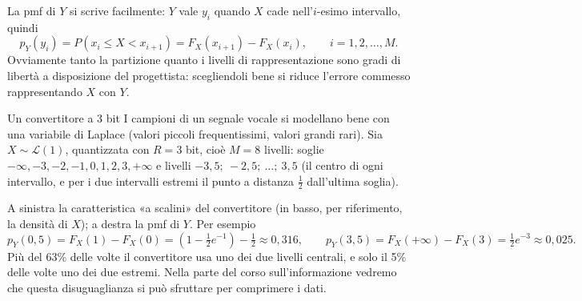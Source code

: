 La pmf di $Y$ si scrive facilmente: $Y$ vale $y_i$ quando $X$ cade nell'$i$-esimo intervallo, quindi
\[ p_Y(y_i) = P(x_i \leq X < x_{i+1}) = F_X(x_{i+1}) - F_X(x_i) , \qquad i = 1, 2, \ldots, M . \]
Ovviamente tanto la partizione quanto i livelli di rappresentazione sono gradi di libertà a disposizione del
progettista: scegliendoli bene si riduce l'errore commesso rappresentando $X$ con $Y$.

\begin{esempio}{Un convertitore a 3 bit}
I campioni di un segnale vocale si modellano bene con una variabile di Laplace (valori piccoli frequentissimi, valori
grandi rari). Sia $X \sim \mathcal{L}(1)$, quantizzata con $R = 3$ bit, cioè $M = 8$ livelli: soglie
$-\infty, -3, -2, -1, 0, 1, 2, 3, +\infty$ e livelli $-3{,}5;\ -2{,}5;\ \ldots;\ 3{,}5$ (il centro di ogni intervallo,
e per i due intervalli estremi il punto a distanza $\frac12$ dall'ultima soglia).
\begin{center}
\end{center}
A sinistra la caratteristica «a scalini» del convertitore (in basso, per riferimento, la densità di $X$); a destra la
pmf di $Y$. Per esempio
\[ p_Y(0{,}5) = F_X(1) - F_X(0) = \left( 1 - \tfrac12 e^{-1} \right) - \tfrac12 \approx 0{,}316 , \qquad
   p_Y(3{,}5) = F_X(+\infty) - F_X(3) = \tfrac12 e^{-3} \approx 0{,}025 . \]
Più del 63\% delle volte il convertitore usa uno dei due livelli centrali, e solo il 5\% delle volte uno dei due
estremi. Nella parte del corso sull'informazione vedremo che questa disuguaglianza si può sfruttare per comprimere i
dati.
\end{esempio}

